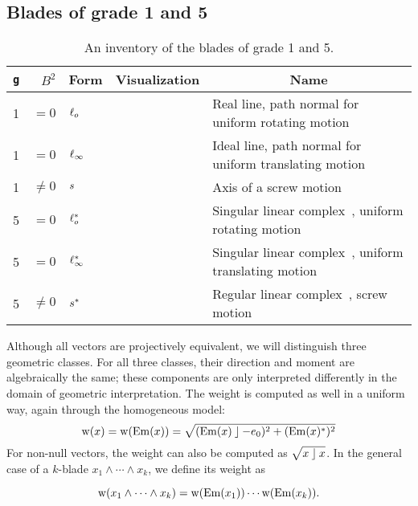 \subsection{Blades of grade 1 and 5}
\begin{table}
  \caption{An inventory of the blades of grade 1 and 5.}
  \label{tab:inv1}
  \begin{center}
    \begin{tabular}{|c|r|p{2.7cm}|p{2cm}|p{5cm}|}
      \hline
      \multicolumn{1}{|c|}{\texttt{g}} & $B^2$ & \multicolumn{1}{|c|}{Form} & \multicolumn{1}{|c|}{Visualization} & \multicolumn{1}{|c|}{Name} \\ \hline
      \hline
      1 & $= 0$ & $\ell_o$ & & Real line, path normal for uniform rotating motion~\cite{Pottmann}\\ \hline
      1 & $= 0$ & $\ell_\infty$ & & Ideal line, path normal for uniform translating motion~\cite{Pottmann}\\ \hline
      1 & $\not= 0$ & $s$ & & Axis of a screw motion~\cite{Pottmann}\\ \hline
      5 & $= 0$ & $\ell_o^\ast$ & & Singular linear complex~\cite{Pottmann}, uniform rotating motion \\ \hline
      5 & $= 0$ & $\ell_\infty^\ast$ & & Singular linear complex~\cite{Pottmann}, uniform translating motion \\ \hline
      5 & $\not= 0$ & $s^\ast$ & & Regular linear complex~\cite{Pottmann}, screw motion \\ \hline
    \end{tabular}
  \end{center}
\end{table}
Although all vectors are projectively equivalent, we will distinguish three geometric classes.  For all three classes, their direction and moment are algebraically the same; these components are only interpreted differently in the domain of geometric interpretation.  The weight is computed as well in a uniform way, again through the homogeneous model:
\begin{equation*}
  \operatorname{w}(x) = 
      \operatorname{w}(\operatorname{Em}(x)) = \sqrt{(\operatorname{Em}(x) \mathbin{\rfloor} -e_0)^2 + (\operatorname{Em}(x)^\ast)^2} 
\end{equation*}
For non-null vectors, the weight can also be computed as $\sqrt{x \mathbin{\rfloor} x}$.  In the general case of a $k$-blade $x_1 \wedge \cdots \wedge x_k$, we define its weight as 

\begin{equation*}
  \operatorname{w}(x_1 \wedge \cdots \wedge x_k) = \operatorname{w}(\operatorname{Em}(x_1)) \cdots \operatorname{w}(\operatorname{Em}(x_k)) .
\end{equation*}

